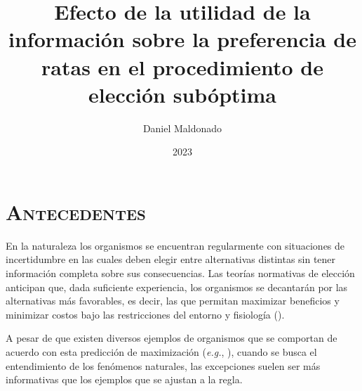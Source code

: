 \documentclass[a4paper,12pt]{article}
\title{Efecto de la utilidad de la información sobre la preferencia de ratas en el procedimiento de elección subóptima}
\author{Daniel Maldonado}
\date{2023}
\begin{document}
{\scshape\bfseries \maketitle}

\section{\scshape Antecedentes}\label{antecedentes}

En la naturaleza los organismos se encuentran regularmente con situaciones de incertidumbre en las cuales deben elegir entre alternativas distintas sin tener información completa sobre sus consecuencias.
Las teorías normativas de elección anticipan que, dada suficiente experiencia, los organismos se decantarán por las alternativas más favorables, es decir, las que permitan maximizar beneficios y minimizar costos bajo las restricciones del entorno y fisiología (\cite{Pyke1977}).

A pesar de que existen diversos ejemplos de organismos que se comportan de acuerdo con esta predicción de maximización ({\itshape e.g.}, \cite{Harper1982, Bshary2002}), cuando se busca el entendimiento de los fenómenos naturales, las excepciones suelen ser más informativas que los ejemplos que se ajustan a la regla.
\end{document}
